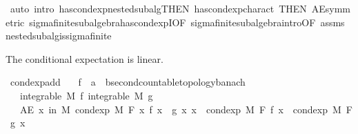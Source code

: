 \begin{isabellebody}
\ {\isacharparenleft}{\kern0pt}auto\ intro{\isacharbang}{\kern0pt}{\isacharcolon}{\kern0pt}\ has{\isacharunderscore}{\kern0pt}cond{\isacharunderscore}{\kern0pt}exp{\isacharunderscore}{\kern0pt}nested{\isacharunderscore}{\kern0pt}subalg{\isacharbrackleft}{\kern0pt}THEN\ has{\isacharunderscore}{\kern0pt}cond{\isacharunderscore}{\kern0pt}exp{\isacharunderscore}{\kern0pt}charact{\isacharparenleft}{\kern0pt}{}{\isacharparenright}{\kern0pt}{\isacharcomma}{\kern0pt}\ THEN\ AE{\isacharunderscore}{\kern0pt}symmetric{\isacharbrackright}{\kern0pt}\ sigma{\isacharunderscore}{\kern0pt}finite{\isacharunderscore}{\kern0pt}subalgebra{\isachardot}{\kern0pt}has{\isacharunderscore}{\kern0pt}cond{\isacharunderscore}{\kern0pt}expI{\isacharbrackleft}{\kern0pt}OF\ sigma{\isacharunderscore}{\kern0pt}finite{\isacharunderscore}{\kern0pt}subalgebra{\isachardot}{\kern0pt}intro{\isacharbrackleft}{\kern0pt}OF\ assms{\isacharparenleft}{\kern0pt}{}{\isacharparenright}{\kern0pt}{\isacharbrackright}{\kern0pt}{\isacharbrackright}{\kern0pt}\ nested{\isacharunderscore}{\kern0pt}subalg{\isacharunderscore}{\kern0pt}is{\isacharunderscore}{\kern0pt}sigma{\isacharunderscore}{\kern0pt}finite{\isacharparenright}{\kern0pt}%
\endisatagproof
{\isafoldproof}%
%
\isadelimproof
%
\endisadelimproof
%
\begin{isamarkuptext}%
The conditional expectation is linear.%
\end{isamarkuptext}\isamarkuptrue%
\isamarkupfalse%
\ cond{\isacharunderscore}{\kern0pt}exp{\isacharunderscore}{\kern0pt}add{\isacharcolon}{\kern0pt}\isanewline
\ \ \ f\ {\isacharcolon}{\kern0pt}{\isacharcolon}{\kern0pt}\ {\isachardoublequoteopen}{\isacharprime}{\kern0pt}a\ {\isasymRightarrow}\ {\isacharprime}{\kern0pt}b{\isacharcolon}{\kern0pt}{\isacharcolon}{\kern0pt}{\isacharbraceleft}{\kern0pt}second{\isacharunderscore}{\kern0pt}countable{\isacharunderscore}{\kern0pt}topology{\isacharcomma}{\kern0pt}banach{\isacharbraceright}{\kern0pt}{\isachardoublequoteclose}\isanewline
\ \ \ {\isachardoublequoteopen}integrable\ M\ f{\isachardoublequoteclose}\ {\isachardoublequoteopen}integrable\ M\ g{\isachardoublequoteclose}\isanewline
\ \ \ {\isachardoublequoteopen}AE\ x\ in\ M{\isachardot}{\kern0pt}\ cond{\isacharunderscore}{\kern0pt}exp\ M\ F\ {\isacharparenleft}{\kern0pt}{\isasymlambda}x{\isachardot}{\kern0pt}\ f\ x\ {\isacharplus}{\kern0pt}\ g\ x{\isacharparenright}{\kern0pt}\ x\ {\isacharequal}{\kern0pt}\ cond{\isacharunderscore}{\kern0pt}exp\ M\ F\ f\ x\ {\isacharplus}{\kern0pt}\ cond{\isacharunderscore}{\kern0pt}exp\ M\ F\ g\ x{\isachardoublequoteclose}\isanewline

\end{isabellebody}
